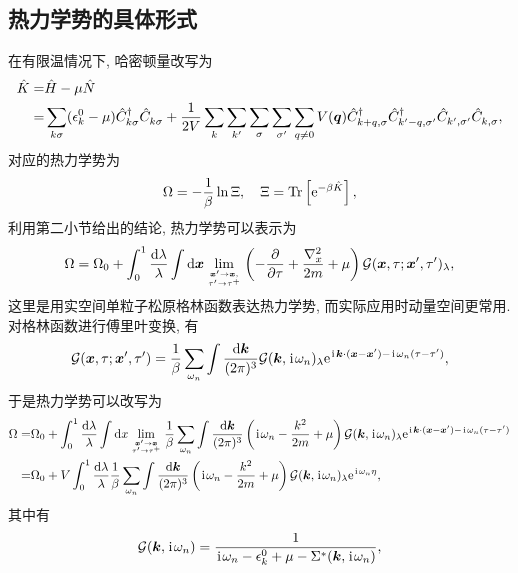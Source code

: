 \subsection{热力学势的具体形式}
在有限温情况下, 哈密顿量改写为 
 \begin{align}
        \hat{K}=&\hat{H}-\mu\hat{N}\nonumber\\
        =&\sum_{k\sigma}(\epsilon_k^0-\mu)\hat{C}_{k\sigma}^\dagger \hat{C}_{k\sigma}^{ }+\frac{1}{2V}\sum_k\sum_{k'}\sum_\sigma\sum_{\sigma'}\sum_{q\ne 0}V(\boldsymbol{q})\hat{C}_{k+q,\sigma}^\dagger \hat{C}_{k'-q,\sigma'}^\dagger \hat{C}_{k',\sigma'}^{ }\hat{C}_{k,\sigma}^{ },
    \end{align}
对应的热力学势为 
\begin{equation}
    \Omega=-\frac{1}{\beta}\ln \Xi,\quad \Xi=\mathrm{Tr}\left[ \mathrm{e}^{-\beta\hat{K}} \right],
\end{equation}
利用第二小节给出的结论, 热力学势可以表示为
\begin{equation}
    \Omega=\Omega_0+\int_0^1\frac{\mathrm{d}\lambda}{\lambda}\int\mathrm{d}\boldsymbol{x}\lim_{\boldsymbol{x}'\to \boldsymbol{x},\atop \tau'\to \tau^+}\left( -\frac{\partial}{\partial \tau}+\frac{\nabla^2_x}{2m}+\mu \right) \mathcal{G}(\boldsymbol{x},\tau;\boldsymbol{x}',\tau')_{\lambda},
\end{equation}
这里是用实空间单粒子松原格林函数表达热力学势, 而实际应用时动量空间更常用. 对格林函数进行傅里叶变换, 有 
\begin{equation}
    \mathcal{G}(\boldsymbol{x},\tau;\boldsymbol{x}',\tau')=\frac{1}{\beta}\sum_{\omega_n}\int\frac{\mathrm{d}\boldsymbol{k}}{(2\pi)^3}\mathcal{G}(\boldsymbol{k},\hspace{0.1em}\mathrm{i}\hspace{0.1em}\omega_n)_\lambda \mathrm{e}^{\hspace{0.1em}\mathrm{i}\hspace{0.1em}\boldsymbol{k}\cdot (\boldsymbol{x}-\boldsymbol{x}')-\hspace{0.1em}\mathrm{i}\hspace{0.1em}\omega_n(\tau-\tau')},
\end{equation}
于是热力学势可以改写为 
   \begin{align}
        \Omega=&\Omega_0+\int_0^1\frac{\mathrm{d}\lambda}{\lambda}\int \mathrm{d} x\lim_{\boldsymbol{x}'\to \boldsymbol{x}\atop \tau'\to \tau^+}\frac{1}{\beta}\sum_{\omega_n}\int\frac{\mathrm{d}\boldsymbol{k}}{(2\pi)^3}\left( \hspace{0.1em}\mathrm{i}\hspace{0.1em}\omega_n-\frac{k^2}{2m}+\mu \right)\mathcal{G}(\boldsymbol{k},\hspace{0.1em}\mathrm{i}\hspace{0.1em}\omega_n)_\lambda \mathrm{e}^{\hspace{0.1em}\mathrm{i}\hspace{0.1em}\boldsymbol{k}\cdot (\boldsymbol{x}-\boldsymbol{x}')-\hspace{0.1em}\mathrm{i}\hspace{0.1em}\omega_n(\tau-\tau')}\nonumber\\
        =&\Omega_0+V\int_0^1\frac{\mathrm{d}\lambda}{\lambda}\frac{1}{\beta}\sum_{\omega_n}\int\frac{\mathrm{d}\boldsymbol{k}}{(2\pi)^3}\left( \hspace{0.1em}\mathrm{i}\hspace{0.1em}\omega_n-\frac{k^2}{2m}+\mu \right)\mathcal{G}(\boldsymbol{k},\hspace{0.1em}\mathrm{i}\hspace{0.1em}\omega_n)_\lambda \mathrm{e}^{\hspace{0.1em}\mathrm{i}\hspace{0.1em}\omega_n\eta},
    \end{align}
其中有 
\begin{equation}
    \mathcal{G}(\boldsymbol{k},\hspace{0.1em}\mathrm{i}\hspace{0.1em}\omega_n)=\frac{1}{\hspace{0.1em}\mathrm{i}\hspace{0.1em}\omega_n-\epsilon_k^0+\mu-\Sigma^*(\boldsymbol{k},\hspace{0.1em}\mathrm{i}\hspace{0.1em}\omega_n)},
\end{equation}
